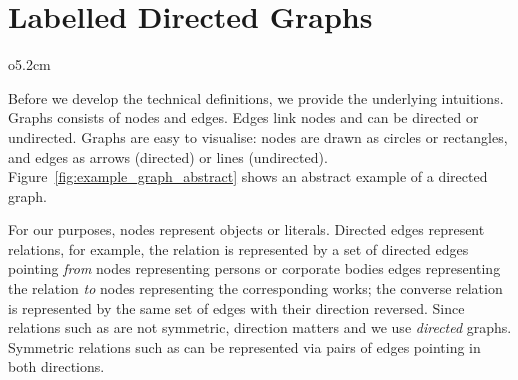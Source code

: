 \section{Labelled Directed Graphs}
\label{sec:labelled_digraphs}

\begin{wrapfigure}[6]{o}{5.2cm}
  \centering
  \vspace*{-.7\baselineskip}
  \caption{A directed graph}
  \label{fig:example_graph_abstract}
\end{wrapfigure}

Before we develop the technical definitions,
we provide the underlying intuitions.
Graphs consists of nodes and edges. Edges link nodes and can be directed
or undirected. Graphs are easy to visualise: nodes are drawn as circles
or rectangles, and edges as arrows (directed) or lines (undirected).
Figure~\ref{fig:example_graph_abstract} shows an abstract example of a directed graph.

For our purposes,
nodes represent objects or literals. 
Directed edges represent relations, 
for example, 
the relation  is represented by a set of directed edges
pointing \emph{from} nodes representing persons or corporate bodies
edges representing the relation
\emph{to} nodes representing the corresponding works;
the converse relation  is represented by the same set of edges 
with their direction reversed.
Since relations such as  are not symmetric,
direction matters and we use \emph{directed} graphs. 
Symmetric relations such as 
can be represented via pairs of edges pointing in both directions.

